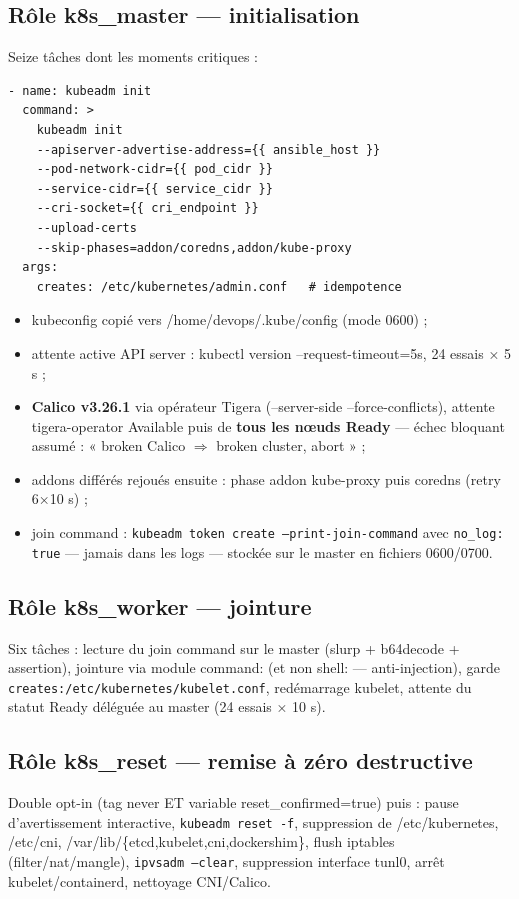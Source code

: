 \documentclass[12pt,a4paper]{article}
\begin{document}
\subsection{Rôle k8s\_master --- initialisation}
Seize tâches dont les moments critiques :

\begin{lstlisting}[caption={kubeadm init : addons différés pour éviter les CrashLoop initiaux}]
- name: kubeadm init
  command: >
    kubeadm init
    --apiserver-advertise-address={{ ansible_host }}
    --pod-network-cidr={{ pod_cidr }}
    --service-cidr={{ service_cidr }}
    --cri-socket={{ cri_endpoint }}
    --upload-certs
    --skip-phases=addon/coredns,addon/kube-proxy
  args:
    creates: /etc/kubernetes/admin.conf   # idempotence
\end{lstlisting}

\begin{itemize}[itemsep=1pt]
  \item kubeconfig copié vers /home/devops/.kube/config (mode 0600) ;
  \item attente active API server : kubectl version --request-timeout=5s, 24 essais × 5 s ;
  \item \textbf{Calico v3.26.1} via opérateur Tigera (--server-side --force-conflicts), attente tigera-operator Available puis de \textbf{tous les nœuds Ready} --- échec bloquant assumé : « broken Calico $\Rightarrow$ broken cluster, abort » ;
  \item addons différés rejoués ensuite : phase addon kube-proxy puis coredns (retry 6×10 s) ;
  \item join command : \texttt{kubeadm token create --print-join-command} avec \texttt{no\_log: true} --- jamais dans les logs --- stockée sur le master en fichiers 0600/0700.
\end{itemize}

\subsection{Rôle k8s\_worker --- jointure}
Six tâches : lecture du join command sur le master (slurp + b64decode + assertion), jointure via module command: (et non shell: --- anti-injection), garde \texttt{creates:/etc/kubernetes/kubelet.conf}, redémarrage kubelet, attente du statut Ready déléguée au master (24 essais × 10 s).

\subsection{Rôle k8s\_reset --- remise à zéro destructive}
Double opt-in (tag never ET variable reset\_confirmed=true) puis : pause d'avertissement interactive, \texttt{kubeadm reset -f}, suppression de /etc/kubernetes, /etc/cni, /var/lib/\{etcd,kubelet,cni,dockershim\}, flush iptables (filter/nat/mangle), \texttt{ipvsadm --clear}, suppression interface tunl0, arrêt kubelet/containerd, nettoyage CNI/Calico.
\end{document}
